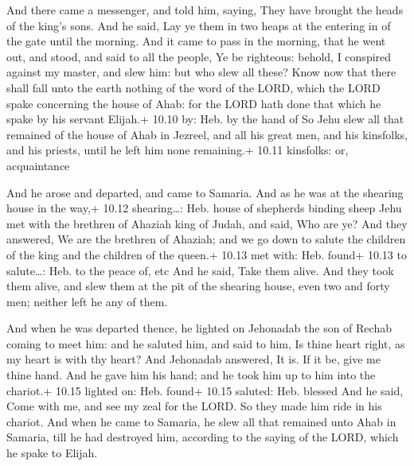  And there came a messenger, and told him, saying, They
have brought the heads of the king's sons. And he said, Lay ye them in
two heaps at the entering in of the gate until the morning. 
And it came to pass in the morning, that he went out, and stood, and
said to all the people, Ye be righteous: behold, I conspired against my
master, and slew him: but who slew all these?  Know now
that there shall fall unto the earth nothing of the word of the LORD,
which the LORD spake concerning the house of Ahab: for the LORD hath
done that which he spake by his servant Elijah.+ 10.10 by: Heb. by the
hand of  So Jehu slew all that remained of the house of
Ahab in Jezreel, and all his great men, and his kinsfolks, and his
priests, until he left him none remaining.+ 10.11 kinsfolks: or,
acquaintance

 And he arose and departed, and came to Samaria. And as
he was at the shearing house in the way,+ 10.12 shearing\ldots: Heb.
house of shepherds binding sheep  Jehu met with the
brethren of Ahaziah king of Judah, and said, Who are ye? And they
answered, We are the brethren of Ahaziah; and we go down to salute the
children of the king and the children of the queen.+ 10.13 met with:
Heb. found+ 10.13 to salute\ldots: Heb. to the peace of, etc
 And he said, Take them alive. And they took them alive,
and slew them at the pit of the shearing house, even two and forty men;
neither left he any of them.

 And when he was departed thence, he lighted on Jehonadab
the son of Rechab coming to meet him: and he saluted him, and said to
him, Is thine heart right, as my heart is with thy heart? And Jehonadab
answered, It is. If it be, give me thine hand. And he gave him his hand;
and he took him up to him into the chariot.+ 10.15 lighted on: Heb.
found+ 10.15 saluted: Heb. blessed  And he said, Come with
me, and see my zeal for the LORD. So they made him ride in his chariot.
 And when he came to Samaria, he slew all that remained
unto Ahab in Samaria, till he had destroyed him, according to the saying
of the LORD, which he spake to Elijah.


